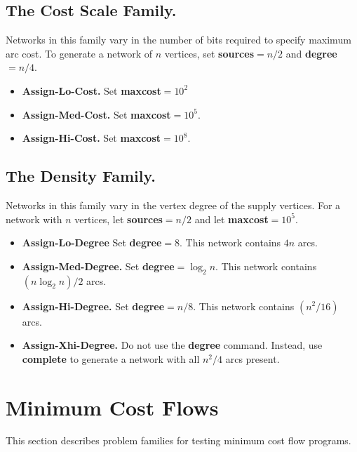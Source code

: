\subsection{The Cost Scale Family.}

Networks in this family vary in the number of bits required to specify
maximum arc cost.  To generate a network of $n$ vertices, set {\bf
sources}$=n/2$ and {\bf degree}$=n/4$.

\begin{itemize}
\item {\bf Assign-Lo-Cost.} Set {\bf maxcost}$=10^2$

\item {\bf Assign-Med-Cost.} Set {\bf maxcost}$=10^5$.

\item {\bf Assign-Hi-Cost.}  Set {\bf maxcost}$=10^8$. 
\end{itemize} 

\subsection{The Density Family.}
Networks in this family vary in the vertex degree of the supply
vertices.  For a network with $n$ vertices, let {\bf sources}$ = n/2$
and let {\bf maxcost}$=10^5$.

\begin{itemize} 
\item {\bf Assign-Lo-Degree}  Set {\bf degree}$=8$.  This network 
contains $4n$ arcs.

\item {\bf Assign-Med-Degree.}  Set {\bf degree}$= \log_2 n$.  This network 
contains $(n \log_2 n) /2$ arcs.

\item {\bf Assign-Hi-Degree.}  Set {\bf degree}$=n/8$.  This network
contains $(n^2/16)$ arcs.

\item {\bf Assign-Xhi-Degree.}  Do not use the {\bf degree} command. Instead,
use {\bf complete} to generate a network with all $n^2/4$ arcs
present.

\end{itemize} 

\section{Minimum Cost Flows}

This section describes problem families for testing minimum
cost flow programs.

